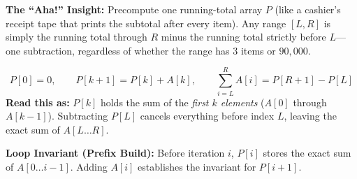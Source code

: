 \documentclass[11pt,a4paper]{article}
\theoremstyle{definition}
\newcommand{\ahabeat}{\textbf{\color{accentteal}The ``Aha!'' Insight:} }
\newcommand{\invariantbeat}[1]{\par\noindent\textbf{\color{accentteal}Loop Invariant (#1):} }
\begin{document}
\ahabeat Precompute one running-total array $P$ (like a cashier's receipt tape that prints the subtotal after every item). Any range $[L, R]$ is simply the running total through $R$ minus the running total strictly before $L$---one subtraction, regardless of whether the range has $3$ items or $90{,}000$.

\begin{formulabox}
\[
    P[0] = 0, \qquad P[k + 1] = P[k] + A[k], \qquad \sum_{i=L}^{R} A[i] = P[R + 1] - P[L]
\]
\textbf{Read this as:} $P[k]$ holds the sum of the \emph{first $k$ elements} ($A[0]$ through $A[k-1]$). Subtracting $P[L]$ cancels everything before index $L$, leaving the exact sum of $A[L \dots R]$.
\end{formulabox}

\invariantbeat{Prefix Build} Before iteration $i$, $P[i]$ stores the exact sum of $A[0 \dots i - 1]$. Adding $A[i]$ establishes the invariant for $P[i + 1]$.
\end{document}
